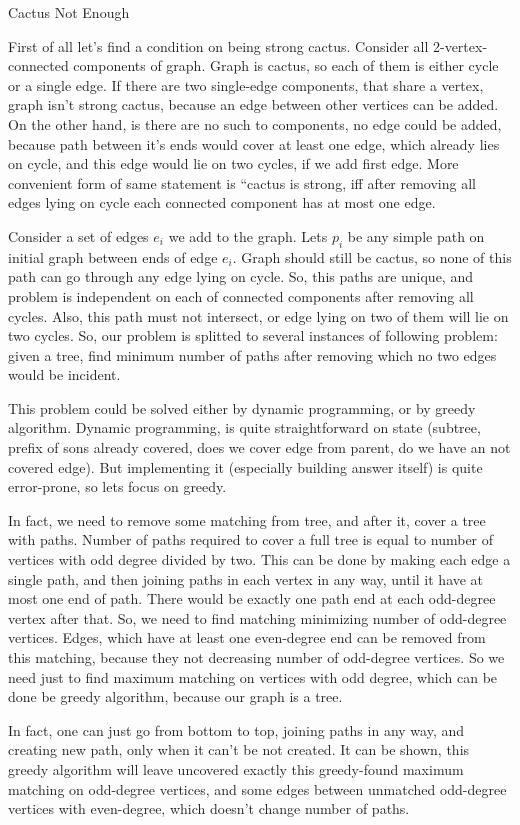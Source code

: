 \begin{tutorial}{Cactus Not Enough}

First of all let's find a condition on being strong cactus. Consider all 2-vertex-connected components of graph. Graph is cactus, so each of them is either cycle or a single edge. If there are two single-edge components, that share a vertex, graph isn't strong cactus, because an edge between other vertices can be added. On the other hand, is there are no such to components, no edge could be added, because path between it's ends would cover at least one edge, which already lies on cycle, and this edge would lie on two cycles, if we add first edge. More convenient form of same statement is ``cactus is strong, iff after removing all edges lying on cycle each connected component has at most one edge. 

Consider a set of edges $e_i$ we add to the graph. Lets $p_i$ be any simple path on initial graph between ends of edge $e_i$. Graph should still be cactus, so none of this path can go through any edge lying on cycle. So, this paths are unique, and problem is independent on each of connected components after removing all cycles. Also, this path must not intersect, or edge lying on two of them will lie on two cycles. So, our problem is splitted to several instances of following problem: given a tree, find minimum number of paths after removing which no two edges would be incident.

This problem could be solved either by dynamic programming, or by greedy algorithm. Dynamic programming, is quite straightforward on state (subtree, prefix of sons already covered, does we cover edge from parent, do we have an not covered edge). But implementing it (especially building answer itself) is quite error-prone, so lets focus on greedy. 

In fact, we need to remove some matching from tree, and after it, cover a tree with paths. Number of paths required to cover a full tree is equal to number of vertices with odd degree divided by two. This can be done by making each edge a single path, and then joining paths in each vertex in any way, until it have at most one end of path. There would be exactly one path end at each odd-degree vertex after that. So, we need to find matching minimizing number of odd-degree vertices. Edges, which have at least one even-degree end can be removed from this matching, because they not decreasing number of odd-degree vertices. So we need just to find maximum matching on vertices with odd degree, which can be done be greedy algorithm, because our graph is a tree. 

In fact, one can just go from bottom to top, joining paths in any way, and creating new path, only when it can't be not created. It can be shown, this greedy algorithm will leave uncovered exactly this greedy-found maximum matching on odd-degree vertices, and some edges between unmatched odd-degree vertices with even-degree, which doesn't change number of paths. 



\end{tutorial}
